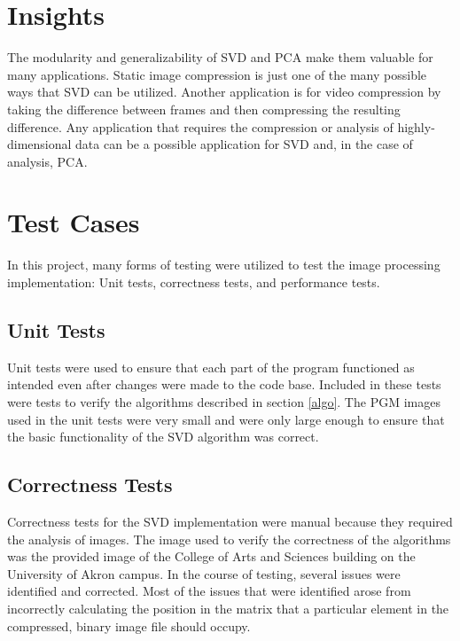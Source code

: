 \documentclass[conference]{IEEEtran}
\begin{document}
\section{Insights}
The modularity and generalizability of SVD and PCA make them valuable for 
many applications. Static image compression is just one of the many possible
ways that SVD can be utilized. Another application is for video compression by
taking the difference between frames and then compressing the resulting difference.
Any application that requires the compression or analysis of highly-dimensional data
can be a possible application for SVD and, in the case of analysis, PCA. 


\section{Test Cases}
In this project, many forms of testing were utilized to test the image processing implementation: Unit tests, correctness tests,
and performance tests.

\subsection{Unit Tests}
Unit tests were used to ensure that each part of the program functioned as intended even after
changes were made to the code base. Included in these tests were tests to verify the algorithms
described in section \ref{algo}. The PGM images used in the unit tests were very small and were
only large enough to ensure that the basic functionality of the SVD algorithm was correct.  


\subsection{Correctness Tests}
Correctness tests for the SVD implementation were manual because they required the analysis of images.
The image used to verify the correctness of the algorithms was the provided image of the College of 
Arts and Sciences building on the University of Akron campus. In the course of testing, several issues
were identified and corrected. Most of the issues that were identified arose from incorrectly calculating
the position in the matrix that a particular element in the compressed, binary image file should occupy. 
\end{document}
